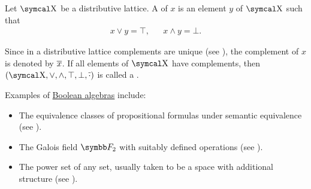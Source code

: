 \begin{definition}\label{def:boolean_algebra}\cite{nLab:boolean_algebra}
  Let \( \CX \) be a distributive lattice. A  of \( x \) is an element \( y \) of \( \CX \) such that
  \begin{align*}
    x \vee y = \top, && x \wedge y = \bot.
  \end{align*}

  Since in a distributive lattice complements are unique (see ), the complement of \( x \) is denoted by \( \overline{x} \). If all elements of \( \CX \) have complements, then \( (\CX, \vee, \wedge, \top, \bot, \Ol \cdot) \) is called a .
\end{definition}

\begin{example}\label{ex:boolean_algebras}
  Examples of \hyperref[def:boolean_algebra]{Boolean algebras} include:

  \begin{itemize}
    \item The equivalence classes of propositional formulas under semantic equivalence (see ).
    \item The Galois field \( \BF_2 \) with suitably defined operations (see ).
    \item The power set of any set, usually taken to be a space with additional structure (see ).
  \end{itemize}
\end{example}

